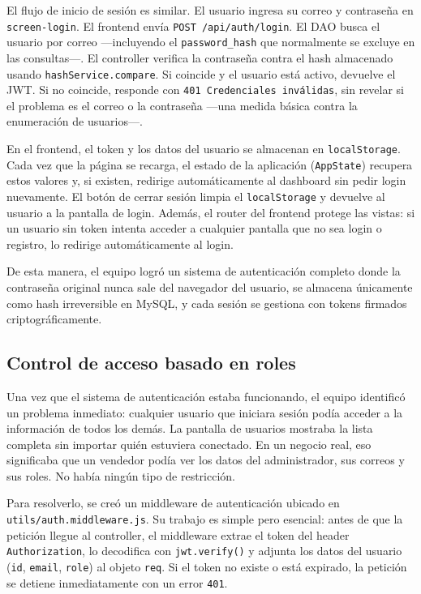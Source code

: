 \documentclass[journal]{IEEEtran}
\begin{document}
	El flujo de inicio de sesi\'{o}n es similar. El usuario ingresa
	su correo y contrase\~{n}a en \texttt{screen-login}. El frontend
	env\'{i}a \texttt{POST /api/auth/login}. El DAO busca el usuario
	por correo ---incluyendo el \texttt{password\_hash} que
	normalmente se excluye en las consultas---. El controller
	verifica la contrase\~{n}a contra el hash almacenado usando
	\texttt{hashService.compare}. Si coincide y el usuario est\'{a}
	activo, devuelve el JWT. Si no coincide, responde con
	\texttt{401 Credenciales inv\'{a}lidas}, sin revelar si el
	problema es el correo o la contrase\~{n}a ---una medida
	b\'{a}sica contra la enumeraci\'{o}n de usuarios---.
	
	En el frontend, el token y los datos del usuario se almacenan en
	\texttt{localStorage}. Cada vez que la p\'{a}gina se recarga, el
	estado de la aplicaci\'{o}n (\texttt{AppState}) recupera estos
	valores y, si existen, redirige autom\'{a}ticamente al dashboard
	sin pedir login nuevamente. El bot\'{o}n de cerrar
	sesi\'{o}n limpia el \texttt{localStorage} y devuelve al usuario
	a la pantalla de login. Adem\'{a}s, el router del frontend
	protege las vistas: si un usuario sin token intenta acceder a
	cualquier pantalla que no sea login o registro, lo redirige
	autom\'{a}ticamente al login.
	
	De esta manera, el equipo logr\'{o} un sistema de
	autenticaci\'{o}n completo donde la contrase\~{n}a original
	nunca sale del navegador del usuario, se almacena \'{u}nicamente
	como hash irreversible en MySQL, y cada sesi\'{o}n se gestiona
	con tokens firmados criptogr\'{a}ficamente.
	
	\subsection{Control de acceso basado en roles}
	\label{subsec:rbac}
	
	Una vez que el sistema de autenticaci\'{o}n estaba funcionando,
	el equipo identific\'{o} un problema inmediato: cualquier
	usuario que iniciara sesi\'{o}n pod\'{i}a acceder a la
	informaci\'{o}n de todos los dem\'{a}s. La pantalla de
	usuarios mostraba la lista completa sin importar qui\'{e}n
	estuviera conectado. En un negocio real, eso significaba que
	un vendedor pod\'{i}a ver los datos del administrador, sus
	correos y sus roles. No hab\'{i}a ning\'{u}n tipo de
	restricci\'{o}n.
	
	Para resolverlo, se cre\'{o} un middleware de autenticaci\'{o}n
	ubicado en \texttt{utils/auth.middleware.js}. Su trabajo es
	simple pero esencial: antes de que la petici\'{o}n llegue al
	controller, el middleware extrae el token del header
	\texttt{Authorization}, lo decodifica con
	\texttt{jwt.verify()} y adjunta los datos del usuario
	(\texttt{id}, \texttt{email}, \texttt{role}) al objeto
	\texttt{req}. Si el token no existe o est\'{a} expirado, la
	petici\'{o}n se detiene inmediatamente con un error
	\texttt{401}.
	
\end{document}
